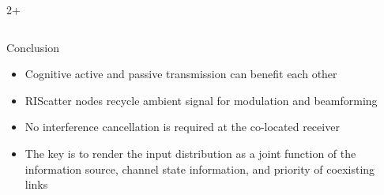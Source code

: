 \documentclass[final,xcolor={table}]{beamer}
\newlength{\sepwidth}
\newlength{\colwidth}
\newcommand{\separatorcolumn}{\begin{column}{\sepwidth}\end{column}}
\begin{document}
\begin{frame}[t]
\begin{columns}[t]
\begin{column}{2\colwidth+\sepwidth}
\begin{columns}[t,totalwidth=\textwidth]
\begin{column}{\colwidth}
					\begin{block}{Conclusion}
						\begin{itemize}\setlength\itemsep{20pt}
							\item Cognitive active and passive transmission can benefit each other
							\item RIScatter nodes recycle ambient signal for modulation and beamforming
							\item No interference cancellation is required at the co-located receiver
							\item The key is to render the input distribution as a joint function of the information source, channel state information, and priority of coexisting links
						\end{itemize}
					\end{block}
				\end{column}
			\end{columns}
		\end{column}

		\separatorcolumn
	\end{columns}










\end{frame}
\end{document}
